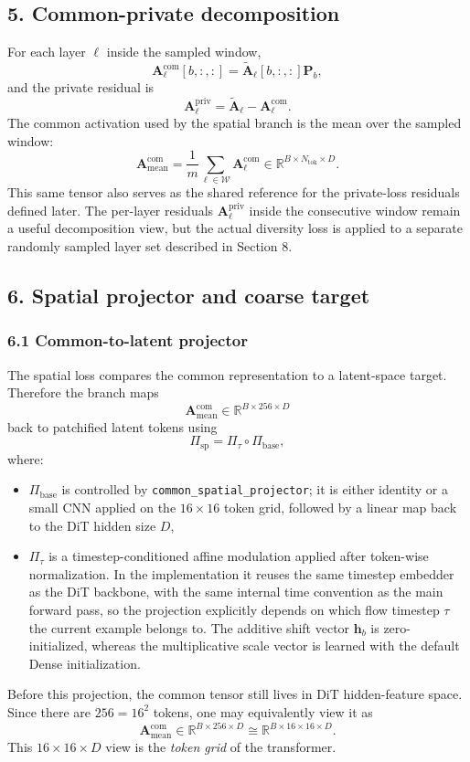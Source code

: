 \documentclass[11pt]{article}
\begin{document}
\subsection*{5. Common-private decomposition}
For each layer $\ell$ inside the sampled window,
\[
  \bm{A}^{\mathrm{com}}_\ell[b,:,:]
  =
  \tilde{\bm{A}}_\ell[b,:,:]\bm{P}_b,
\]
and the private residual is
\[
  \bm{A}^{\mathrm{priv}}_\ell
  =
  \tilde{\bm{A}}_\ell - \bm{A}^{\mathrm{com}}_\ell.
\]
The common activation used by the spatial branch is the mean over the sampled window:
\[
  \bm{A}^{\mathrm{com}}_{\mathrm{mean}}
  =
  \frac{1}{m}\sum_{\ell\in\mathcal{W}} \bm{A}^{\mathrm{com}}_\ell
  \in
  \mathbb{R}^{B\times N_{\mathrm{tok}}\times D}.
\]
This same tensor also serves as the shared reference for the private-loss residuals defined later.
The per-layer residuals $\bm{A}^{\mathrm{priv}}_\ell$ inside the consecutive window remain a useful decomposition view, but the actual diversity loss is applied to a separate randomly sampled layer set described in Section 8.

\subsection*{6. Spatial projector and coarse target}
\subsubsection*{6.1 Common-to-latent projector}
The spatial loss compares the common representation to a latent-space target. Therefore the branch maps
\[
  \bm{A}^{\mathrm{com}}_{\mathrm{mean}}
  \in \mathbb{R}^{B\times 256\times D}
\]
back to patchified latent tokens using
\[
  \Pi_{\mathrm{sp}}
  =
  \Pi_{\tau}
  \circ
  \Pi_{\mathrm{base}},
\]
where:
\begin{itemize}
  \item $\Pi_{\mathrm{base}}$ is controlled by \texttt{common\_spatial\_projector}; it is either identity or a small CNN applied on the $16\times 16$ token grid, followed by a linear map back to the DiT hidden size $D$,
  \item $\Pi_{\tau}$ is a timestep-conditioned affine modulation applied after token-wise normalization. In the implementation it reuses the same timestep embedder as the DiT backbone, with the same internal time convention as the main forward pass, so the projection explicitly depends on which flow timestep $\tau$ the current example belongs to. The additive shift vector $\bm{h}_b$ is zero-initialized, whereas the multiplicative scale vector is learned with the default Dense initialization.
\end{itemize}
Before this projection, the common tensor still lives in DiT hidden-feature space. Since there are $256=16^2$ tokens, one may equivalently view it as
\[
  \bm{A}^{\mathrm{com}}_{\mathrm{mean}}
  \in \mathbb{R}^{B\times 256\times D}
  \cong
  \mathbb{R}^{B\times 16\times 16\times D}.
\]
This $16\times 16\times D$ view is the \emph{token grid} of the transformer.
\end{document}
